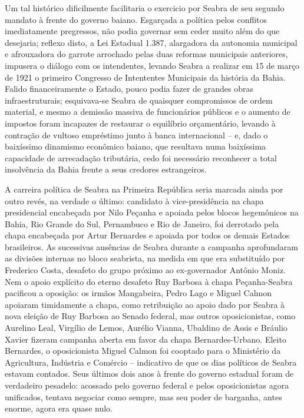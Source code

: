 Um tal histórico dificilmente facilitaria o exercicio por Seabra de seu segundo mandato à frente do governo baiano. Esgarçada a política pelos conflitos imediatamente pregressos, não podia governar sem ceder muito além do que desejaria; reflexo disto, a Lei Estadual 1.387, alargadora da autonomia municipal e afrouxadora do garrote arrochado pelas duas reformas municipais anteriores, impusera o diálogo com os intendentes, levando Seabra a realizar em 15 de março de 1921 o primeiro Congresso de Intententes Municipais da história da Bahia. Falido financeiramente o Estado, pouco podia fazer de grandes obras infraestruturais; esquivava-se Seabra de quaisquer compromissos de ordem material, e mesmo a demissão massiva de funcionários públicos e o aumento de impostos foram incapazes de restaurar o equilíbrio orçamentário, levando à contração de vultoso empréstimo junto à banca internacional -- e, dado o baixíssimo dinamismo econômico baiano, que resultava numa baixíssima capacidade de arrecadação tributária, cedo foi necessário reconhecer a total insolvência da Bahia frente a seus credores estrangeiros. 

A carreira política de Seabra na Primeira República seria marcada ainda por outro revés, na verdade o último: candidato à vice-presidência na chapa presidencial encabeçada por Nilo Peçanha e apoiada pelos blocos hegemônicos na Bahia, Rio Grande do Sul, Pernambuco e Rio de Janeiro, foi derrotado pela chapa encabeçada por Artur Bernardes e apoiada por todos os demais Estados brasileiros. As sucessivas ausências de Seabra durante a campanha aprofundaram as divisões internas no bloco seabrista, na medida em que era substituído por Frederico Costa, desafeto do grupo próximo ao ex-governador Antônio Moniz. Nem o apoio explícito do eterno desafeto Ruy Barbosa à chapa Peçanha-Seabra pacificou a oposição: os irmãos Mangabeira, Pedro Lago e Miguel Calmon apoiaram timidamente a chapa, como retribuição ao apoio dado por Seabra à nova eleição de Ruy Barbosa ao Senado federal, mas outros oposicionistas, como Aurelino Leal, Virgílio de Lemos, Aurélio Vianna, Ubaldino de Assis e Bráulio Xavier fizeram campanha aberta em favor da chapa Bernardes-Urbano. Eleito Bernardes, o oposicionista Miguel Calmon foi cooptado para o Ministério da Agricultura, Indústria e Comércio -- indicativo de que os dias políticos de Seabra estavam contados. Seus últimos dois anos à frente do governo estadual foram de verdadeiro pesadelo: acossado pelo governo federal e pelos oposicionistas agora unificados, tentava negociar como sempre, mas seu poder de barganha, antes enorme, agora era quase nulo. 

